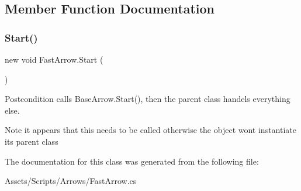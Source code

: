 \subsection{Member Function Documentation}
\mbox{\label{class_fast_arrow_a112df0c78fbcd99d22fc083c08e785de}} 
\subsubsection{\texorpdfstring{Start()}{Start()}}
{\footnotesize\ttfamily new void Fast\+Arrow.\+Start (\begin{DoxyParamCaption}{ }\end{DoxyParamCaption})\hspace{0.3cm}{\ttfamily [private]}}

\begin{DoxyPostcond}{Postcondition}
calls Base\+Arrow.\+Start(), then the parent class handels everything else. 
\end{DoxyPostcond}
\begin{DoxyNote}{Note}
it appears that this needs to be called otherwise the object won\textquotesingle{}t instantiate it\textquotesingle{}s parent class 
\end{DoxyNote}


The documentation for this class was generated from the following file\+:\begin{DoxyCompactItemize}
\item 
Assets/\+Scripts/\+Arrows/Fast\+Arrow.\+cs\end{DoxyCompactItemize}
